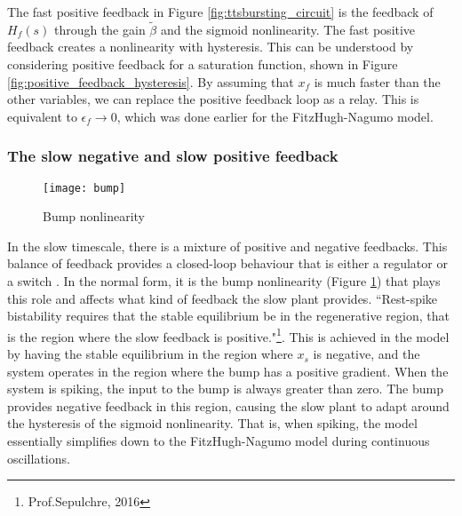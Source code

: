 \documentclass[a4paper, 12pt]{article}
\begin{document}
The fast positive feedback in Figure \ref{fig:ttsbursting_circuit} is the feedback of $H_f(s)$ through the gain $\tilde{\beta}$ and the sigmoid nonlinearity. The fast positive feedback creates a nonlinearity with hysteresis. This can be understood by considering positive feedback for a saturation function, shown in Figure \ref{fig:positive_feedback_hysteresis}. By assuming that $x_f$ is much faster than the other variables, we can replace the positive feedback loop as a relay. This is equivalent to $\epsilon_f\rightarrow 0$, which was done earlier for the FitzHugh-Nagumo model. 

\subsubsection{The slow negative and slow positive feedback}
\begin{figure}[h!]
\texttt{[image: bump]}
\caption{Bump nonlinearity}
\label{fig:bump_nonlinearity}
\end{figure}
In the slow timescale, there is a mixture of positive and negative feedbacks. This balance of feedback provides a closed-loop behaviour that is either a regulator or a switch \cite{drion}. In the normal form, it is the bump nonlinearity (Figure \ref{fig:bump_nonlinearity}) that plays this role and affects what kind of feedback the slow plant provides. ``Rest-spike bistability requires that the stable equilibrium be in the regenerative region, that is the region where the slow feedback is positive."\footnote{Prof.Sepulchre, 2016}. This is achieved in the model by having the stable equilibrium in the region where $x_s$ is negative, and the system operates in the region where the bump has a positive gradient. When the system is spiking, the input to the bump is always greater than zero. The bump provides negative feedback in this region, causing the slow plant to adapt around the hysteresis of the sigmoid nonlinearity. That is, when spiking, the model essentially simplifies down to the FitzHugh-Nagumo model during continuous oscillations. 
\end{document}
